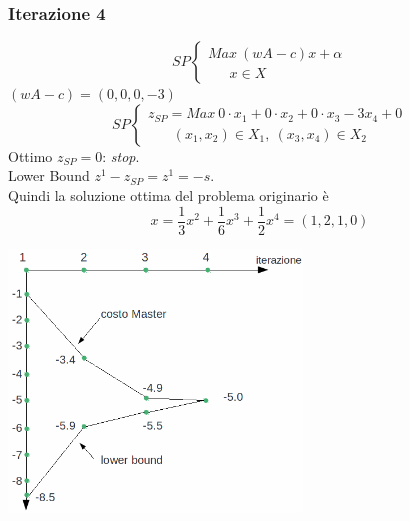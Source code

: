 \subsubsection{Iterazione 4}
\begin{equation*}
	SP
	\begin{cases}
		Max\ (w A-c)x+\alpha \\
		\ \ \ \ \ \ \ x\in X
	\end{cases}
\end{equation*}
$(w A-c)=(0,0,0,-3)$
\begin{equation*}
	SP
	\begin{cases}
		z_{SP}=Max\ 0\cdot x_{1}+0\cdot x_{2}+0\cdot x_{3}-3x_{4}+0 \\
		\ \ \ \ \ \ \ \ (x_{1},x_{2})\in X_{1},\ (x_{3},x_{4})\in X_{2} 
	\end{cases}
\end{equation*}
Ottimo $z_{SP}=0$: \textit{stop}.\\
Lower Bound $z^{1}-z_{SP}=z^{1}=-s$.\\
Quindi la soluzione ottima del problema originario è
\begin{equation*}
	x=\frac{1}{3}x^{2}+\frac{1}{6}x^{3}+\frac{1}{2}x^{4}=(1,2,1,0)
\end{equation*}
\centerline{\includegraphics[height=7cm]{images/graph52.png}}\\

